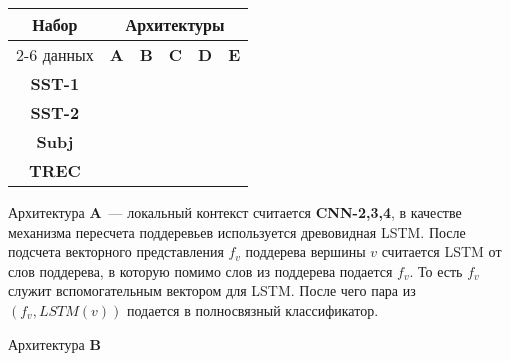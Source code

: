 \vspace{5mm}
\noindent \begin{minipage}{\linewidth}
 \label{tab:title} 
\begin{tabular}{|c|c|c|c|c|c|}
\hline
\multirow{2}{*}{Набор}   &             \multicolumn{5}{c|}{Архитектуры} \\ \cline{2-6} 
     данных              &  \textbf{A}  & \textbf{B} & \textbf{C} & \textbf{D} & \textbf{E} \\ \hline
\textbf{SST-1}           &              &            &            &            &            \\ \hline
\textbf{SST-2}           &              &            &            &            &            \\ \hline
\textbf{Subj}            &              &            &            &            &            \\ \hline
\textbf{TREC}            &              &            &            &            &            \\ \hline
\end{tabular}
\end{minipage}
\vspace{5mm}

Архитектура \textbf{A}~--- локальный контекст считается \textbf{CNN-2,3,4}, в качестве механизма пересчета поддеревьев используется древовидная LSTM. После подсчета векторного представления $f_v$ поддерева вершины $v$ считается LSTM от слов поддерева, в которую помимо слов из поддерева подается $f_v$. То есть $f_v$ служит вспомогательным вектором для
LSTM. После чего пара из $(f_v, LSTM(v))$ подается в полносвязный классификатор.

Архитектура \textbf{B}